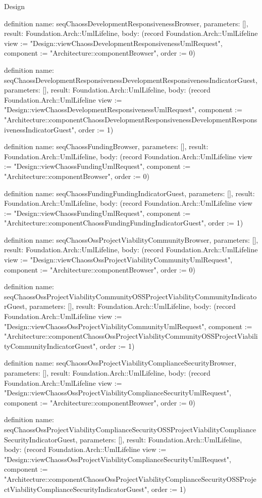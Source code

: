 \begin{lexlean}{Design}
\begin{semanticmodule}
definition{
  name: seqChaossDevelopmentResponsivenessBrowser,
  parameters: [],
  result: Foundation.Arch::UmlLifeline,
  body: (record Foundation.Arch::UmlLifeline {view := "Design::viewChaossDevelopmentResponsivenessUmlRequest", component := "Architecture::componentBrowser", order := 0})
}

definition{
  name: seqChaossDevelopmentResponsivenessDevelopmentResponsivenessIndicatorGuest,
  parameters: [],
  result: Foundation.Arch::UmlLifeline,
  body: (record Foundation.Arch::UmlLifeline {view := "Design::viewChaossDevelopmentResponsivenessUmlRequest", component := "Architecture::componentChaossDevelopmentResponsivenessDevelopmentResponsivenessIndicatorGuest", order := 1})
}

definition{
  name: seqChaossFundingBrowser,
  parameters: [],
  result: Foundation.Arch::UmlLifeline,
  body: (record Foundation.Arch::UmlLifeline {view := "Design::viewChaossFundingUmlRequest", component := "Architecture::componentBrowser", order := 0})
}

definition{
  name: seqChaossFundingFundingIndicatorGuest,
  parameters: [],
  result: Foundation.Arch::UmlLifeline,
  body: (record Foundation.Arch::UmlLifeline {view := "Design::viewChaossFundingUmlRequest", component := "Architecture::componentChaossFundingFundingIndicatorGuest", order := 1})
}

definition{
  name: seqChaossOssProjectViabilityCommunityBrowser,
  parameters: [],
  result: Foundation.Arch::UmlLifeline,
  body: (record Foundation.Arch::UmlLifeline {view := "Design::viewChaossOssProjectViabilityCommunityUmlRequest", component := "Architecture::componentBrowser", order := 0})
}

definition{
  name: seqChaossOssProjectViabilityCommunityOSSProjectViabilityCommunityIndicatorGuest,
  parameters: [],
  result: Foundation.Arch::UmlLifeline,
  body: (record Foundation.Arch::UmlLifeline {view := "Design::viewChaossOssProjectViabilityCommunityUmlRequest", component := "Architecture::componentChaossOssProjectViabilityCommunityOSSProjectViabilityCommunityIndicatorGuest", order := 1})
}

definition{
  name: seqChaossOssProjectViabilityComplianceSecurityBrowser,
  parameters: [],
  result: Foundation.Arch::UmlLifeline,
  body: (record Foundation.Arch::UmlLifeline {view := "Design::viewChaossOssProjectViabilityComplianceSecurityUmlRequest", component := "Architecture::componentBrowser", order := 0})
}

definition{
  name: seqChaossOssProjectViabilityComplianceSecurityOSSProjectViabilityComplianceSecurityIndicatorGuest,
  parameters: [],
  result: Foundation.Arch::UmlLifeline,
  body: (record Foundation.Arch::UmlLifeline {view := "Design::viewChaossOssProjectViabilityComplianceSecurityUmlRequest", component := "Architecture::componentChaossOssProjectViabilityComplianceSecurityOSSProjectViabilityComplianceSecurityIndicatorGuest", order := 1})
}


\end{semanticmodule}
\end{lexlean}
